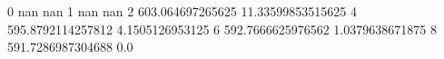 0 nan nan
1 nan nan
2 603.064697265625 11.33599853515625
4 595.8792114257812 4.1505126953125
6 592.7666625976562 1.0379638671875
8 591.7286987304688 0.0
